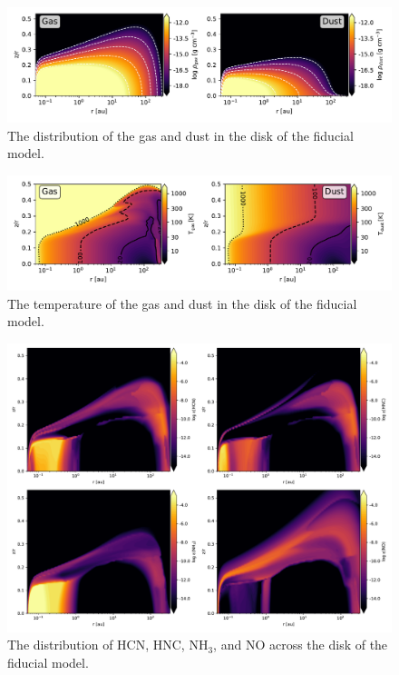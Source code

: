 \documentclass[twoside,single, authoryear, semicolon]{lion-msc}
\begin{document}
\begin{figure}[!ht]
    \centering
    \includegraphics[width=\linewidth]{Figures/Density.pdf}
    \caption{The distribution of the gas and dust in the disk of the fiducial model.}
    \label{fig:enter-label}
\end{figure}
\begin{figure}[!ht]
    \centering
    \includegraphics[width=\linewidth]{Figures/Temperature.pdf}
    \caption{The temperature of the gas and dust in the disk of the fiducial model.}
    \label{fig:enter-label}
\end{figure}
\begin{figure}[!ht]
    \centering
    \includegraphics[width=\linewidth]{Figures/Abundance.pdf}
    \caption{The distribution of HCN, HNC, NH$_3$, and NO across the disk of the fiducial model.}
    \label{fig:enter-label}
\end{figure}
\end{document}
